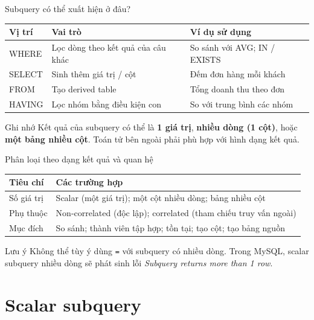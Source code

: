 \documentclass[aspectratio=169,10pt]{beamer}
\newcommand{\code}[1]{\texttt{#1}}
\begin{document}
\begin{frame}[fragile]{Subquery có thể xuất hiện ở đâu?}
\small
\begin{tabularx}{\linewidth}{>{\ttfamily}l X X}\toprule
Vị trí & Vai trò & Ví dụ sử dụng\\\midrule
WHERE & Lọc dòng theo kết quả của câu khác & So sánh với AVG; IN / EXISTS\\
SELECT & Sinh thêm giá trị / cột & Đếm đơn hàng mỗi khách\\
FROM & Tạo derived table & Tổng doanh thu theo đơn\\
HAVING & Lọc nhóm bằng điều kiện con & So với trung bình các nhóm\\\bottomrule
\end{tabularx}
\vspace{.7em}
\begin{block}{Ghi nhớ}
\small Kết quả của subquery có thể là \textbf{1 giá trị}, \textbf{nhiều dòng (1 cột)}, hoặc \textbf{một bảng nhiều cột}. Toán tử bên ngoài phải phù hợp với hình dạng kết quả.
\end{block}
\end{frame}

\begin{frame}[fragile]{Phân loại theo dạng kết quả và quan hệ}
\small
\begin{tabularx}{\linewidth}{l X}\toprule
Tiêu chí & Các trường hợp\\\midrule
Số giá trị & Scalar (một giá trị); một cột nhiều dòng; bảng nhiều cột\\
Phụ thuộc & Non-correlated (độc lập); correlated (tham chiếu truy vấn ngoài)\\
Mục đích & So sánh; thành viên tập hợp; tồn tại; tạo cột; tạo bảng nguồn\\\bottomrule
\end{tabularx}
\vspace{.6em}
\begin{alertblock}{Lưu ý}
\small Không thể tùy ý dùng \code{=} với subquery có nhiều dòng. Trong MySQL, scalar subquery nhiều dòng sẽ phát sinh lỗi \emph{Subquery returns more than 1 row}.
\end{alertblock}
\end{frame}

\section{Scalar subquery}
\end{document}
